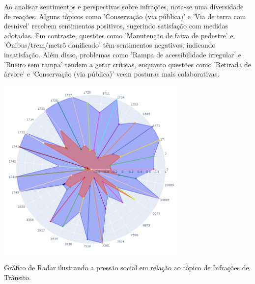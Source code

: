 Ao analisar sentimentos e perspectivas sobre infrações, nota-se uma diversidade de reações. Alguns tópicos como 'Conservação (via pública)' e 'Via de terra com desnível' recebem sentimentos positivos, sugerindo satisfação com medidas adotadas. Em contraste, questões como 'Manutenção de faixa de pedestre' e 'Ônibus/trem/metrô danificado' têm sentimentos negativos, indicando insatisfação. Além disso, problemas como 'Rampa de acessibilidade irregular' e 'Bueiro sem tampa' tendem a gerar críticas, enquanto questões como 'Retirada de árvore' e 'Conservação (via pública)' veem posturas mais colaborativas.

\begin{quadro}[htb]
	\centering
	\includegraphics[width=0.7\textwidth]{images/social_barometer_traffic.png}
	\caption{Gráfico de Radar ilustrando a pressão social em relação ao tópico de Infrações de Trânsito.}
	\label{fig:social_barometer_traffic}
\end{quadro}

